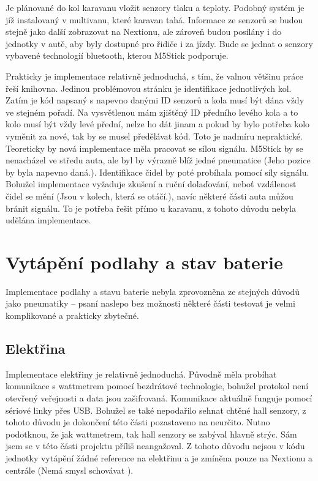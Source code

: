 \documentclass[a4paper,oneside,12pt]{report}
\begin{document}
Je plánované do kol karavanu vložit senzory tlaku a teploty.
Podobný systém je jíž instalovaný v multivanu, které karavan tahá.
Informace ze senzorů se budou stejně jako další zobrazovat na Nextionu, ale zároveň budou posílány i do jednotky v autě, aby byly dostupné pro řidiče i za jízdy.
Bude se jednat o senzory vybavené technologií bluetooth, kterou M5Stick podporuje.

Prakticky je implementace relativně jednoduchá, s tím, že valnou většinu práce řeší knihovna.
Jedinou problémovou stránku je identifikace jednotlivých kol.
Zatím je kód napsaný s napevno danými ID senzorů a kola musí být dána vždy ve stejném pořadí.
Na vysvětlenou mám zjištěný ID předního levého kola a to kolo musí být vždy levé přední, nelze ho dát jinam a pokud by bylo potřeba kolo vyměnit za nové, tak by se musel předělávat kód.
Toto je nadmíru nepraktické.
Teoreticky by nová implementace měla pracovat se sílou signálu.
M5Stick by se nenacházel ve středu auta, ale byl by výrazně blíž jedné pneumatice (Jeho pozice by byla napevno daná.).
Identifikace čidel by poté probíhala pomocí síly signálu.
Bohužel implementace vyžaduje zkušení a ruční dolaďování, neboť vzdálenost čidel se mění (Jsou v kolech, která se otáčí.), navíc některé části auta můžou bránit signálu.
To je potřeba řešit přímo u karavanu, z tohoto důvodu nebyla udělána implementace.

\section{Vytápění podlahy a stav baterie}

Implementace podlahy a stavu baterie nebyla zprovozněna ze stejných důvodů jako pneumatiky -- psaní naslepo bez možnosti některé části testovat je velmi komplikované a prakticky zbytečné.

\subsection{Elektřina}

Implementace elektřiny je relativně jednoduchá.
Původně měla probíhat komunikace s wattmetrem pomocí bezdrátové technologie, bohužel protokol není otevřený veřejnosti a data jsou zašifrovaná.
Komunikace aktuálně funguje pomocí sériové linky přes USB.
Bohužel se také nepodařilo sehnat chtěné hall senzory, z tohoto důvodu je dokončení této části pozastaveno na neurčito.
Nutno podotknou, že jak wattmetrem, tak hall senzory se zabýval hlavně strýc.
Sám jsem se v této části projektu příliš neangažoval.
Z tohoto důvodu nejsou v kódu jednotky vytápění žádné reference na elektřinu a je zmíněna pouze na Nextionu a centrále (Nemá smysl schovávat ).
\end{document}
